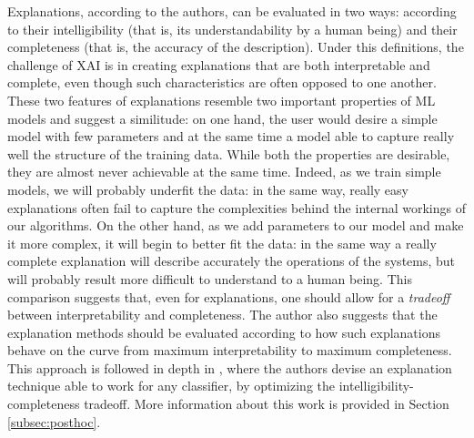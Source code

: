 Explanations, according to the authors, can be evaluated in two ways: according to their intelligibility (that is, its understandability by a human being) and their completeness (that is, the accuracy of the description). Under this definitions, the challenge of XAI is in creating explanations that are both interpretable and complete, even though such characteristics are often opposed to one another. These two features of explanations resemble two important properties of ML models and suggest a similitude: on one hand, the user would desire a simple model with few parameters and at the same time a model able to capture really well the structure of the training data. While both the properties are desirable, they are almost never achievable at the same time. Indeed, as we train simple models, we will probably underfit the data: in the same way, really easy explanations often fail to capture the complexities behind the internal workings of our algorithms. On the other hand, as we add parameters to our model and make it more complex, it will begin to better fit the data: in the same way a really complete explanation will describe accurately the operations of the systems, but will probably result more difficult to understand to a human being. This comparison suggests that, even for explanations, one should allow for a \textit{tradeoff} between interpretability and completeness. The author also suggests that the explanation methods should be evaluated according to how such explanations behave on the curve from maximum interpretability to maximum completeness. This approach is followed in depth in \cite{ribeiro2016trust}, where the authors devise an explanation technique able to work for any classifier, by optimizing the intelligibility-completeness tradeoff. More information about this work is provided in Section \ref{subsec:posthoc}.


